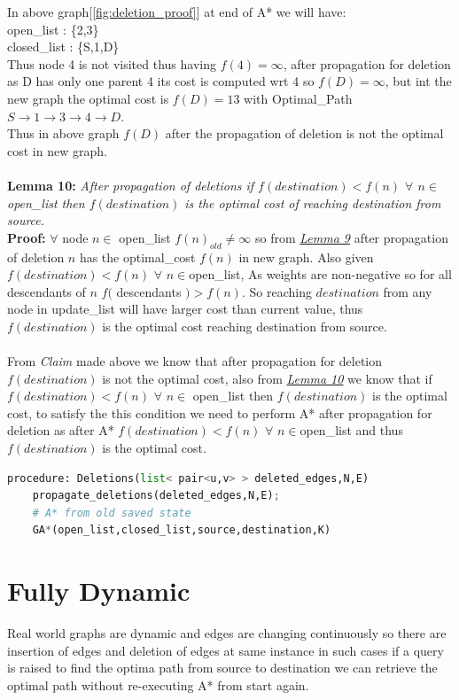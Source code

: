 \documentclass[a4paper]{article}
\begin{document}
In above graph[\ref{fig:deletion_proof}] at end of A* we will have:\\
open\_list : \{2,3\}\\
closed\_list : \{S,1,D\}\\
Thus node 4 is not visited thus having $f(4)=\infty$, after propagation for deletion as D has only one parent 4 its cost is computed wrt 4 so $f(D)=\infty$, but int the new graph the optimal cost is $f(D)=13$ with Optimal\_Path $S\rightarrow 1\rightarrow 3 \rightarrow 4 \rightarrow D$.\\
Thus in above graph $f(D)$ after the propagation of deletion is not the optimal cost in new graph.\\
\\
\hypertarget{Lemma 10}{\textbf{Lemma 10:} }\textit{After propagation of deletions if $f(destination) < f(n)$ $ \forall$ $n \in $open\_list then $f(destination)$ is the optimal cost of reaching destination from source.}\\
\textbf{Proof:} $\forall$ node $n \in $ open\_list $f(n)_{old} \neq \infty$ so from \hyperlink{Lemma 9}{\textit{Lemma 9}} after propagation of deletion $n$ has the optimal\_cost $f(n)$ in new graph. Also given $f(destination) < f(n)$ $ \forall$ $n \in $open\_list, As weights are non-negative so for all descendants of $n$ $f($ descendants $) > f(n)$. So reaching $destination$ from any node in update\_list will have larger cost than current value, thus $f(destination)$ is the optimal cost reaching destination from source.\\
\\
From \textit{Claim} made above we know that after propagation for deletion $f(destination)$ is not the optimal cost, also from \hyperlink{Lemma 10}{\textit{Lemma 10}} we know that if $f(destination) < f(n)$ $ \forall$ $n \in $ open\_list then $f(destination)$ is the optimal cost, to satisfy the this condition we need to perform A* after propagation for deletion as after A* $f(destination) < f(n)$ $ \forall$ $n \in $open\_list and thus $f(destination)$ is the optimal cost.
\begin{lstlisting}[language=python, caption=Manage Deletions]
procedure: Deletions(list< pair<u,v> > deleted_edges,N,E)
    propagate_deletions(deleted_edges,N,E);
    # A* from old saved state
    GA*(open_list,closed_list,source,destination,K)

\end{lstlisting}
\section{Fully Dynamic}
Real world graphs are dynamic and edges are changing continuously so there are insertion of edges and deletion of edges at same instance in such cases if a query is raised to find the optima path from source to destination we can retrieve the optimal path without re-executing A* from start again.
\end{document}
